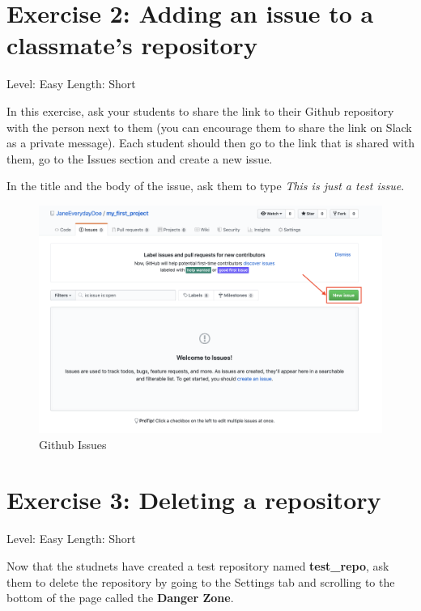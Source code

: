 \documentclass[]{book}
\begin{document}
\hypertarget{exercise-2-adding-an-issue-to-a-classmates-repository}{%
\section*{Exercise 2: Adding an issue to a classmate's repository}\label{exercise-2-adding-an-issue-to-a-classmates-repository}}

Level: Easy
Length: Short

In this exercise, ask your students to share the link to their Github repository with the person next to them (you can encourage them to share the link on Slack as a private message). Each student should then go to the link that is shared with them, go to the Issues section and create a new issue.

In the title and the body of the issue, ask them to type \emph{This is just a test issue}.

\begin{figure}
\centering
\includegraphics{./images/github_issues.png}
\caption{Github Issues}
\end{figure}

\hypertarget{exercise-3-deleting-a-repository}{%
\section*{Exercise 3: Deleting a repository}\label{exercise-3-deleting-a-repository}}

Level: Easy
Length: Short

Now that the studnets have created a test repository named \textbf{test\_repo}, ask them to delete the repository by going to the Settings tab and scrolling to the bottom of the page called the \textbf{Danger Zone}.
\end{document}
